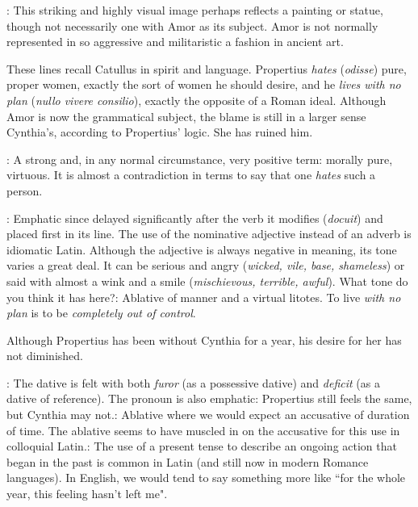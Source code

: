 
: This striking and highly visual image perhaps reflects a painting or statue, though not necessarily one with Amor as its subject.  Amor is not normally represented in so aggressive and militaristic a fashion in ancient art.


These lines recall Catullus in spirit and language.  Propertius \textit{hates} (\textit{odisse}) pure, proper women, exactly the sort of women he should desire, and he \textit{lives with no plan} (\textit{nullo vivere consilio}), exactly the opposite of a Roman ideal.  Although Amor is now the grammatical subject, the blame is still in a larger sense Cynthia's, according to Propertius' logic.  She has ruined him.


: A strong and, in any normal circumstance, very positive term: morally pure, virtuous.  It is almost a contradiction in terms to say that one \textit{hates} such a person.


: Emphatic since delayed significantly after the verb it modifies (\textit{docuit}) and placed first in its line.  The use of the nominative adjective instead of an adverb is idiomatic Latin.  Although the adjective is always negative in meaning, its tone varies a great deal.  It can be serious and angry (\textit{wicked, vile, base, shameless}) or said with almost a wink and a smile (\textit{mischievous, terrible, awful}).  What tone do you think it has here?\indent{}: Ablative of manner and a virtual litotes. To live \textit{with no plan} is to be \textit{completely out of control}.


Although Propertius has been without Cynthia for a year, his desire for her has not diminished.


: The dative is felt with both \textit{furor} (as a possessive dative) and \textit{deficit} (as a dative of reference).  The pronoun is also emphatic: Propertius still feels the same, but Cynthia may not.\indent{}: Ablative where we would expect an accusative of duration of time.  The ablative seems to have muscled in on the accusative for this use in colloquial Latin.\indent{}: The use of a present tense to describe an ongoing action that began in the past is common in Latin (and still now in modern Romance languages).  In English, we would tend to say something more like ``for the whole year, this feeling hasn't left me".

